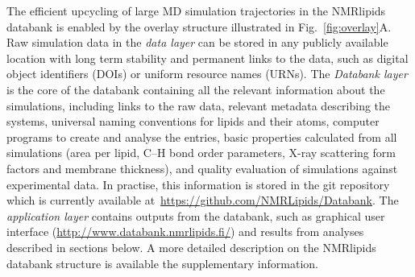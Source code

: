 \documentclass[fleqn,10pt]{wlscirep}
\begin{document}
The efficient upcycling of large MD simulation trajectories in the NMRlipids databank is enabled by the overlay structure illustrated in Fig.~\ref{fig:overlay}A. Raw simulation data in the {\it data layer} can be stored in any publicly available location with long term stability and permanent links to the data, such as digital object identifiers (DOIs) or uniform resource names (URNs). The {\it Databank layer} is the core of the databank containing all the relevant information about the simulations, including links to the raw data, relevant metadata describing the systems, universal naming conventions for lipids and their atoms, computer programs to create and analyse the entries, basic properties calculated from all simulations (area per lipid, C--H bond order parameters, X-ray scattering form factors and membrane thickness), and quality evaluation of simulations against experimental data. In practise, this information is stored in the git repository which is currently available at~\url{https://github.com/NMRLipids/Databank}. The {\it application layer} contains outputs from the databank, such as graphical user interface (\url{http://www.databank.nmrlipids.fi/}) and results from analyses described in sections below. A more detailed description on the NMRlipids databank structure is available the supplementary information. 
\end{document}
